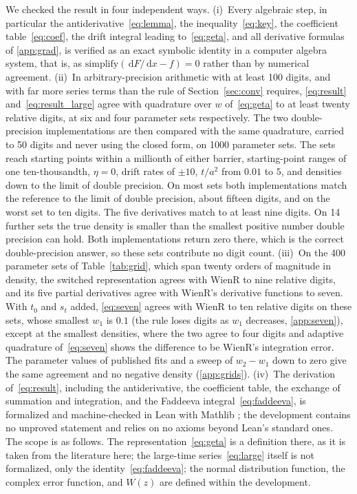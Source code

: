\documentclass[final,5p,times,twocolumn,authoryear]{elsarticle}
\newcommand{\dd}{\,\mathrm{d}}
\begin{document}
We checked the result in four independent ways. (i)~Every algebraic step, in particular the antiderivative~\eqref{eq:lemma}, the inequality~\eqref{eq:key}, the coefficient table~\eqref{eq:coef}, the drift integral leading to~\eqref{eq:geta}, and all derivative formulas of \ref{app:grad}, is verified as an exact symbolic identity in a computer algebra system, that is, as $\mathrm{simplify}(\dd F/\dd x - f) = 0$ rather than by numerical agreement. (ii)~In arbitrary-precision arithmetic with at least 100 digits, and with far more series terms than the rule of Section~\ref{sec:conv} requires, \eqref{eq:result} and~\eqref{eq:result_large} agree with quadrature over $w$ of~\eqref{eq:geta} to at least twenty relative digits, at six and four parameter sets respectively. The two double-precision implementations are then compared with the same quadrature, carried to 50 digits and never using the closed form, on 1000 parameter sets. The sets reach starting points within a millionth of either barrier, starting-point ranges of one ten-thousandth, $\eta = 0$, drift rates of $\pm 10$, $t/a^2$ from $0.01$ to $5$, and densities down to the limit of double precision. On most sets both implementations match the reference to the limit of double precision, about fifteen digits, and on the worst set to ten digits. The five derivatives match to at least nine digits. On 14 further sets the true density is smaller than the smallest positive number double precision can hold. Both implementations return zero there, which is the correct double-precision answer, so these sets contribute no digit count. (iii)~On the 400 parameter sets of Table~\ref{tab:grid}, which span twenty orders of magnitude in density, the switched representation agrees with WienR \citep{HartmannKlauer2021} to nine relative digits, and its five partial derivatives agree with WienR's derivative functions to seven. With $t_0$ and $s_t$ added, \eqref{eq:seven} agrees with WienR to ten relative digits on these sets, whose smallest $w_1$ is $0.1$ (the rule loses digits as $w_1$ decreases, \ref{app:seven}), except at the smallest densities, where the two agree to four digits and adaptive quadrature of~\eqref{eq:seven} shows the difference to be WienR's integration error. The parameter values of published fits \citep{tran2021systematic} and a sweep of $w_2 - w_1$ down to zero give the same agreement and no negative density (\ref{app:grids}). (iv)~The derivation of~\eqref{eq:result}, including the antiderivative, the coefficient table, the exchange of summation and integration, and the Faddeeva integral~\eqref{eq:faddeeva}, is formalized and machine-checked in Lean with Mathlib \citep{deMouraUllrich2021, mathlib2020}; the development contains no unproved statement and relies on no axioms beyond Lean's standard ones. The scope is as follows. The representation~\eqref{eq:geta} is a definition there, as it is taken from the literature here; the large-time series~\eqref{eq:large} itself is not formalized, only the identity~\eqref{eq:faddeeva}; the normal distribution function, the complex error function, and $W(z)$ are defined within the development.
\end{document}
